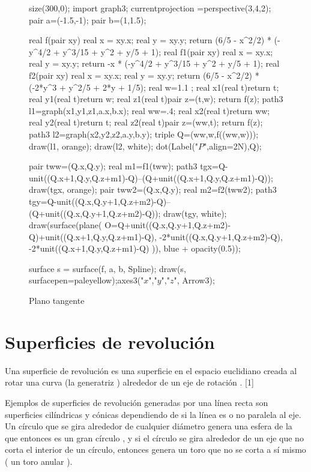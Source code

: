 \begin{figure}[!ht]
	\centering
	\begin{asy}
	size(300,0);
	import graph3;
	currentprojection =perspective(3,4,2);
	pair a=(-1.5,-1);
	pair b=(1,1.5);

	real f(pair xy) {
	real x = xy.x; real y = xy.y;
	return (6/5 - x^2/2) * (-y^4/2 + y^3/15 + y^2 + y/5 + 1);
	}
	real f1(pair xy) {
	real x = xy.x; real y = xy.y;
	return -x * (-y^4/2 + y^3/15 + y^2 + y/5 + 1);
	}
	real f2(pair xy) {
	real x = xy.x; real y = xy.y;
	return (6/5 - x^2/2) * (-2*y^3 + y^2/5 + 2*y + 1/5);
	}
	real w=1.1 ;
	real x1(real t){return t;}
	real y1(real t){return w;}
	real z1(real t){pair z=(t,w); return f(z);}
	path3 l1=graph(x1,y1,z1,a.x,b.x);
	real ww=.4;
	real x2(real t){return ww;}
	real y2(real t){return t;}
	real z2(real t){pair z=(ww,t); return f(z);}
	path3 l2=graph(x2,y2,z2,a.y,b.y);
	triple Q=(ww,w,f((ww,w)));
	draw(l1, orange);
	draw(l2, white);
	dot(Label("$P$",align=2N),Q);

	pair tww=(Q.x,Q.y);
	real m1=f1(tww);
	path3 tgx=Q-unit((Q.x+1,Q.y,Q.z+m1)-Q)--(Q+unit((Q.x+1,Q.y,Q.z+m1)-Q));
	draw(tgx, orange);
	pair tww2=(Q.x,Q.y);
	real m2=f2(tww2);
	path3 tgy=Q-unit((Q.x,Q.y+1,Q.z+m2)-Q)--(Q+unit((Q.x,Q.y+1,Q.z+m2)-Q));
	draw(tgy, white);
	draw(surface(plane(
	O=Q+unit((Q.x,Q.y+1,Q.z+m2)-Q)+unit((Q.x+1,Q.y,Q.z+m1)-Q),
	-2*unit((Q.x,Q.y+1,Q.z+m2)-Q),
	-2*unit((Q.x+1,Q.y,Q.z+m1)-Q)
	)), blue + opacity(0.5));

	surface s = surface(f, a, b, Spline);
	draw(s, surfacepen=paleyellow);axes3("$x$","$y$","$z$", Arrow3);
	\end{asy}
	\caption{Plano tangente}
\end{figure}

\section{Superficies de revolución}




Una superficie de revolución es una superficie en el espacio euclidiano creada al rotar una curva (la generatriz ) alrededor de un eje de rotación . [1]

Ejemplos de superficies de revolución generadas por una línea recta son superficies cilíndricas y cónicas dependiendo de si la línea es o no paralela al eje. Un círculo que se gira alrededor de cualquier diámetro genera una esfera de la que entonces es un gran círculo , y si el círculo se gira alrededor de un eje que no corta el interior de un círculo, entonces genera un toro que no se corta a sí mismo ( un toro anular ).
